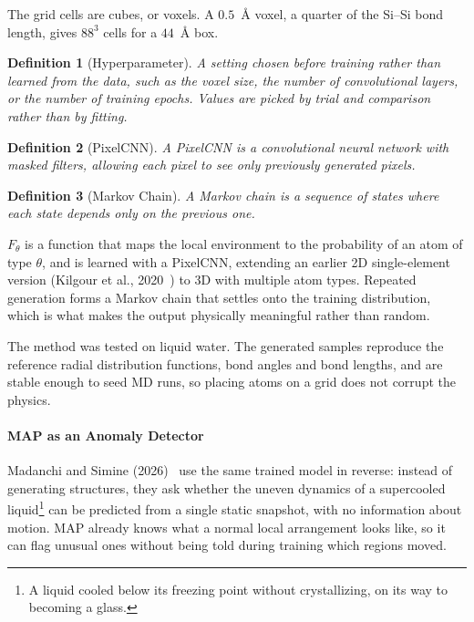 \documentclass{article}
\newtheorem{definition}{Definition}
\begin{document}
The grid cells are cubes, or voxels. A $0.5$~\AA{} voxel, a quarter of the Si--Si bond length, gives $88^3$ cells for a $44$~\AA{} box.
\begin{definition}[Hyperparameter]
    A setting chosen before training rather than learned from the data, such as the voxel size, the number of convolutional layers, or the number of training epochs. Values are picked by trial and comparison rather than by fitting.
\end{definition}
\begin{definition}[PixelCNN]
    A PixelCNN is a convolutional neural network with masked filters, allowing each pixel to see only previously generated pixels.
\end{definition}
\begin{definition}[Markov Chain]
    A Markov chain is a sequence of states where each state depends only on the previous one.
\end{definition}
$F_\theta$ is a function that maps the local environment to the probability of an atom of type $\theta$, and is learned with a PixelCNN, extending an earlier 2D single-element version (Kilgour et al., 2020~\cite{kilgour2020}) to 3D with multiple atom types. Repeated generation forms a Markov chain that settles onto the training distribution, which is what makes the output physically meaningful rather than random.

The method was tested on liquid water. The generated samples reproduce the reference radial distribution functions, bond angles and bond lengths, and are stable enough to seed MD runs, so placing atoms on a grid does not corrupt the physics.

\paragraph{MAP as an Anomaly Detector}
Madanchi and Simine (2026)~\cite{madanchi2026} use the same trained model in reverse: instead of generating structures, they ask whether the uneven dynamics of a supercooled liquid\footnote{A liquid cooled below its freezing point without crystallizing, on its way to becoming a glass.} can be predicted from a single static snapshot, with no information about motion. MAP already knows what a normal local arrangement looks like, so it can flag unusual ones without being told during training which regions moved.
\end{document}
